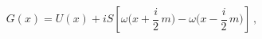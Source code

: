 \begin{equation}
  \label{eq:G}
  G(x) = U(x) + 
i S \left[ \omega\Big(x+\frac i2 \,m\Big) -
\omega\Big(x-\frac i2 \,m\Big)\right]\ ,
\end{equation}

